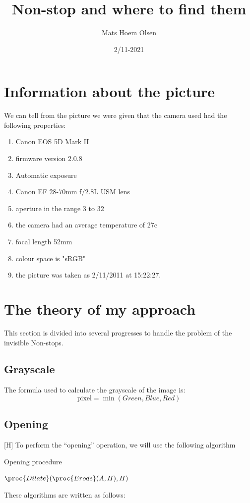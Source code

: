 \documentclass{article}
\title{Non-stop and where to find them}
\author{Mats Hoem Olsen}
\date{2/11-2021}
\begin{document}
\maketitle
\tableofcontents
\listofalgorithms
\newpage
\section{Information about the picture}
We can tell from the picture we were given that the camera used had the following properties:
\begin{enumerate}
\item Canon EOS 5D Mark II
\item firmware version 2.0.8
\item Automatic exposure
\item Canon EF 28-70mm f/2.8L USM lens
\item aperture in the range 3 to 32
\item the camera had an average temperature of 27c
\item focal length 52mm
\item colour space is "sRGB"
\item the picture was taken as 2/11/2011 at 15:22:27.
\end{enumerate}

\section{The theory of my approach}

This section is divided into several progresses to handle the problem of the invisible Non-stops.

\subsection{Grayscale}

The formula used to calculate the grayscale of the image is:
$$
\text{pixel}=\min(Green,Blue,Red)
$$

\subsection{Opening}[H]
To perform the “opening” operation, we will use the following algorithm\cite[page:185-186,192]{wilhelm_burger_digital_nodate}
\begin{algorithm}[H]
\caption{Opening procedure}
\begin{codebox}
\li \Return $\proc{Dilate}(\proc{Erode}(A,H),H)$
\end{codebox}
\end{algorithm}
These algorithms are written as follows:
\end{document}

